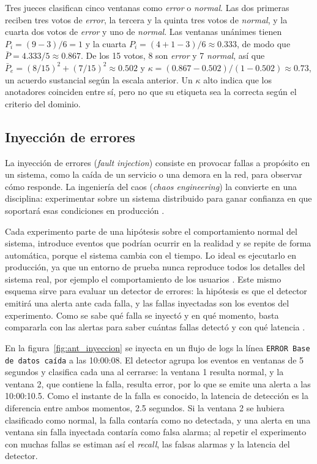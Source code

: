 Tres jueces clasifican cinco ventanas como \emph{error} o \emph{normal}. Las dos primeras reciben tres votos de \emph{error}, la tercera y la quinta tres votos de \emph{normal}, y la cuarta dos votos de \emph{error} y uno de \emph{normal}. Las ventanas unánimes tienen $P_i = (9 - 3)/6 = 1$ y la cuarta $P_i = (4 + 1 - 3)/6 \approx 0.333$, de modo que $\bar{P} = 4.333/5 \approx 0.867$. De los 15 votos, 8 son \emph{error} y 7 \emph{normal}, así que $\bar{P}_e = (8/15)^2 + (7/15)^2 \approx 0.502$ y $\kappa = (0.867 - 0.502)/(1 - 0.502) \approx 0.73$, un acuerdo sustancial según la escala anterior. Un $\kappa$ alto indica que los anotadores coinciden entre sí, pero no que su etiqueta sea la correcta según el criterio del dominio.

\subsection{Inyección de errores}\label{sec:mt_inyeccion}

La inyección de errores (\textit{fault injection}) consiste en provocar fallas a propósito en un sistema, como la caída de un servicio o una demora en la red, para observar cómo responde. La ingeniería del caos (\textit{chaos engineering}) la convierte en una disciplina: experimentar sobre un sistema distribuido para ganar confianza en que soportará esas condiciones en producción \cite{basiri2016_chaos}.

Cada experimento parte de una hipótesis sobre el comportamiento normal del sistema, introduce eventos que podrían ocurrir en la realidad y se repite de forma automática, porque el sistema cambia con el tiempo. Lo ideal es ejecutarlo en producción, ya que un entorno de prueba nunca reproduce todos los detalles del sistema real, por ejemplo el comportamiento de los usuarios \cite{basiri2016_chaos}. Este mismo esquema sirve para evaluar un detector de errores: la hipótesis es que el detector emitirá una alerta ante cada falla, y las fallas inyectadas son los eventos del experimento. Como se sabe qué falla se inyectó y en qué momento, basta compararla con las alertas para saber cuántas fallas detectó y con qué latencia \cite{wang2025_cloudnative_rca}.

En la figura~\ref{fig:ant_inyeccion} se inyecta en un flujo de logs la línea \texttt{ERROR Base de datos caída} a las 10:00:08. El detector agrupa los eventos en ventanas de 5 segundos y clasifica cada una al cerrarse: la ventana 1 resulta normal, y la ventana 2, que contiene la falla, resulta error, por lo que se emite una alerta a las 10:00:10.5. Como el instante de la falla es conocido, la latencia de detección es la diferencia entre ambos momentos, 2.5 segundos. Si la ventana 2 se hubiera clasificado como normal, la falla contaría como no detectada, y una alerta en una ventana sin falla inyectada contaría como falsa alarma; al repetir el experimento con muchas fallas se estiman así el \textit{recall}, las falsas alarmas y la latencia del detector.

